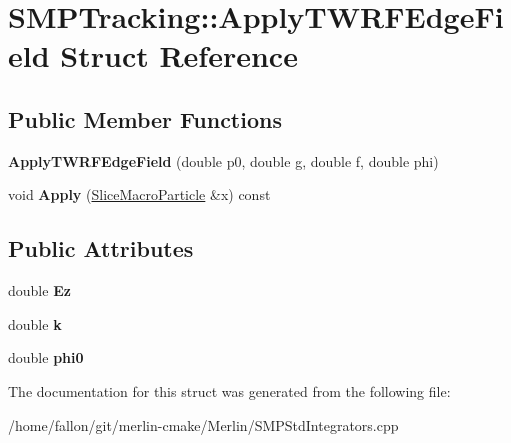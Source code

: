 \hypertarget{structSMPTracking_1_1ApplyTWRFEdgeField}{}\section{S\+M\+P\+Tracking\+:\+:Apply\+T\+W\+R\+F\+Edge\+Field Struct Reference}
\label{structSMPTracking_1_1ApplyTWRFEdgeField}
\subsection*{Public Member Functions}
\begin{DoxyCompactItemize}
\item 
\mbox{\label{structSMPTracking_1_1ApplyTWRFEdgeField_a21703ff6c3e47fc16330ce233b4a77e2}} 
{\bfseries Apply\+T\+W\+R\+F\+Edge\+Field} (double p0, double g, double f, double phi)
\item 
\mbox{\label{structSMPTracking_1_1ApplyTWRFEdgeField_ab80744005d6f613ad45e1ad2160d70c0}} 
void {\bfseries Apply} (\hyperlink{classSMPTracking_1_1SliceMacroParticle}{Slice\+Macro\+Particle} \&x) const
\end{DoxyCompactItemize}
\subsection*{Public Attributes}
\begin{DoxyCompactItemize}
\item 
\mbox{\label{structSMPTracking_1_1ApplyTWRFEdgeField_a7053133c979e1adaae6bc22cb7e1cfed}} 
double {\bfseries Ez}
\item 
\mbox{\label{structSMPTracking_1_1ApplyTWRFEdgeField_acd2a09c6a1b183583aed33a0576115f3}} 
double {\bfseries k}
\item 
\mbox{\label{structSMPTracking_1_1ApplyTWRFEdgeField_a7e3b785289c4778b79ba6fcb9eb94390}} 
double {\bfseries phi0}
\end{DoxyCompactItemize}


The documentation for this struct was generated from the following file\+:\begin{DoxyCompactItemize}
\item 
/home/fallon/git/merlin-\/cmake/\+Merlin/S\+M\+P\+Std\+Integrators.\+cpp\end{DoxyCompactItemize}
